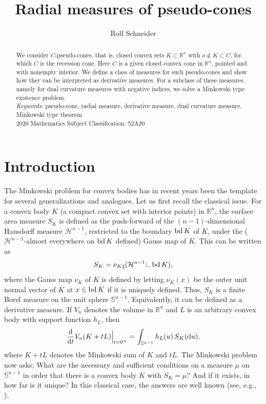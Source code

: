 \documentclass[12pt]{article}
\title{Radial measures of pseudo-cones}
\author{Rolf Schneider}
\date{}
\newcommand{\0}{\mbox{\boldmath$o$}}
\newcommand{\Sn}{{\mathbb S}^{n-1}}
\newcommand{\R}{{\mathbb R}}
\newcommand{\cH}{\mathcal{H}}
\newcommand{\Ha}{\mathcal{H}}
\newcommand{\D}{{\rm d}}
\newcommand{\fed}{\,\rule{.1mm}{.20cm}\rule{.20cm}{.1mm}\,}
\begin{document}
\maketitle


\begin{abstract}
{We consider $C$-pseudo-cones, that is, closed convex sets $K\subset\R^n$ with $o\notin K\subset C$, for which $C$ is the recession cone. Here $C$ is a given closed convex cone in $\R^n$, pointed and with nonempty interior. We define a class of measures for such pseudo-cones and show how they can be interpreted as derivative measures. For a subclass of these measures, namely for dual curvature measures with negative indices, we solve a Minkowski type existence problem.}\\[2mm]
{\em Keywords:} pseudo-cone, radial measure, derivative measure, dual curvature measure, Minkowski type theorem   \\[1mm]
2020 Mathematics Subject Classification: 52A20 
\end{abstract}


\section{Introduction}\label{sec1}

The Minkowski problem for convex bodies has in recent years been the template for several generalizations and analogues. Let us first recall the classical issue. For a convex body $K$ (a compact convex set with interior points) in $\R^n$, the surface area measure $S_K$ is defined as the push-forward of the $(n-1)$-dimensional Hausdorff measure $\cH^{n-1}$, restricted to the boundary ${\rm bd}\,K$ of $K$, under the ($\Ha^{n-1}$-almost everywhere on ${\rm bd}\,K$ defined) Gauss map of $K$. This can be written as
\begin{equation}\label{1.1} 
S_K= \nu_K{_\sharp}(\cH^{n-1}\fed{{\rm bd}\,K}),
\end{equation}
where the Gauss map $\nu_K$ of $K$ is defined by letting $\nu_K(x)$ be the outer unit normal vector of $K$ at $x\in {\rm bd }\,K$ if it is uniquely defined. Thus, $S_K$ is a finite Borel measure on the unit sphere $\Sn$. Equivalently, it can be defined as a derivative measure. If $V_n$ denotes the volume in $\R^n$ and $L$ is an arbitrary convex body with support function $h_L$, then
\begin{equation}\label{1.2}
\frac{\D}{\D t} V_n(K+tL)\Big|_{t=0^+} = \int_{\Sn} h_L(u)\,S_K(\D u),
\end{equation}
where $K+tL$ denotes the Minkowski sum of $K$ and $tL$. The Minkowski problem now asks: What are the necessary and sufficient conditions on a measure $\mu$ on $\Sn$ in order that there is a convex body $K$ with $S_K=\mu$? And if it exists, in how far is it unique? In this classical case, the answers are well known (see, e.g., \cite[Chap. 8]{Sch14}).
\end{document}
